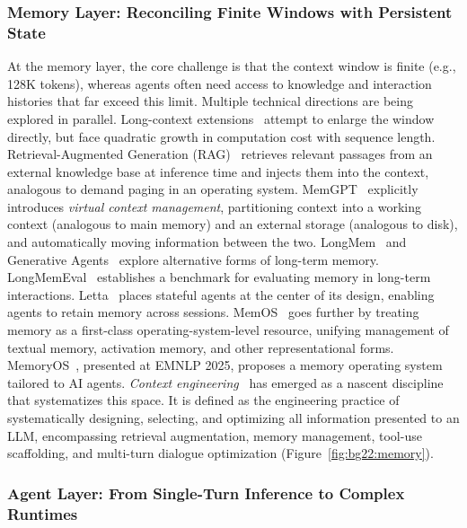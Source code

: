 \subsubsection{Memory Layer: Reconciling Finite Windows with Persistent State}

At the memory layer, the core challenge is that the context window is finite (e.g., 128K tokens), whereas agents often need access to knowledge and interaction histories that far exceed this limit.
Multiple technical directions are being explored in parallel.
Long-context extensions~\cite{gemini2024,yarn2024} attempt to enlarge the window directly, but face quadratic growth in computation cost with sequence length.
Retrieval-Augmented Generation (RAG)~\cite{lewis2020rag} retrieves relevant passages from an external knowledge base at inference time and injects them into the context, analogous to demand paging in an operating system.
MemGPT~\cite{memgpt2023} explicitly introduces \textit{virtual context management}, partitioning context into a working context (analogous to main memory) and an external storage (analogous to disk), and automatically moving information between the two.
LongMem~\cite{longmem2023} and Generative Agents~\cite{park2023generativeagents} explore alternative forms of long-term memory.
LongMemEval~\cite{longmemeval2024} establishes a benchmark for evaluating memory in long-term interactions.
Letta~\cite{letta_stateful_2026} places stateful agents at the center of its design, enabling agents to retain memory across sessions.
MemOS~\cite{memos2025} goes further by treating memory as a first-class operating-system-level resource, unifying management of textual memory, activation memory, and other representational forms.
MemoryOS~\cite{memoryos2025}, presented at EMNLP 2025, proposes a memory operating system tailored to AI agents.
\emph{Context engineering}~\cite{contextengineer_survey2025} has emerged as a nascent discipline that systematizes this space.
It is defined as the engineering practice of systematically designing, selecting, and optimizing all information presented to an LLM, encompassing retrieval augmentation, memory management, tool-use scaffolding, and multi-turn dialogue optimization (Figure~\ref{fig:bg22:memory}).


\subsubsection{Agent Layer: From Single-Turn Inference to Complex Runtimes}

